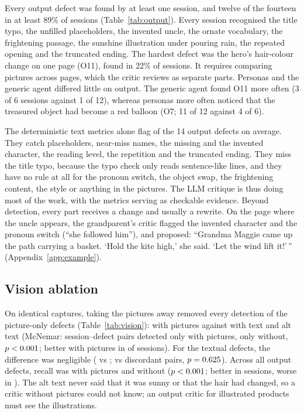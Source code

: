 \documentclass[10pt,twocolumn]{article}
\begin{document}
Every output defect was found by at least one session, and twelve of the fourteen in at least 89\% of sessions (Table~\ref{tab:output}). Every session recognised the title typo, the unfilled placeholders, the invented uncle, the ornate vocabulary, the frightening passage, the sunshine illustration under pouring rain, the repeated opening and the truncated ending. The hardest defect was the hero's hair-colour change on one page (O11), found in 22\% of sessions. It requires comparing pictures across pages, which the critic reviews as separate parts. Personas and the generic agent differed little on output. The generic agent found O11 more often (3 of 6 sessions against 1 of 12), whereas personas more often noticed that the treasured object had become a red balloon (O7; 11 of 12 against 4 of 6).

The deterministic text metrics alone flag \DetBaseline{} of the 14 output defects on average. They catch placeholders, near-miss names, the missing and the invented character, the reading level, the repetition and the truncated ending. They miss the title typo, because the typo check only reads sentence-like lines, and they have no rule at all for the pronoun switch, the object swap, the frightening content, the style or anything in the pictures. The LLM critique is thus doing most of the work, with the metrics serving as checkable evidence. Beyond detection, every part receives a change and usually a rewrite. On the page where the uncle appears, the grandparent's critic flagged the invented character and the pronoun switch (``she followed him''), and proposed: ``Grandma Maggie came up the path carrying a basket. `Hold the kite high,' she said. `Let the wind lift it!'\,'' (Appendix~\ref{app:example}).



\subsection{Vision ablation}
\label{sec:vision}

On identical captures, taking the pictures away removed every detection of the picture-only defects (Table~\ref{tab:vision}): \VisVisualMean{} with pictures against \NoVisVisualMean{} with text and alt text (McNemar: \McBVisual{} session--defect pairs detected only with pictures, \McCVisual{} only without, $p < 0.001$; better with pictures in \SignWVisual{} of \AblRuns{} sessions). For the textual defects, the difference was negligible (\VisTextualMean{} vs \NoVisTextualMean{}; \McBTextual{} vs \McCTextual{} discordant pairs, $p = 0.625$). Across all output defects, recall was \VisAllOutMean{} with pictures and \NoVisAllOutMean{} without ($p < 0.001$; better in \SignWAllOut{} sessions, worse in \SignLAllOut{}). The alt text never said that it was sunny or that the hair had changed, so a critic without pictures could not know; an output critic for illustrated products must see the illustrations.
\end{document}
